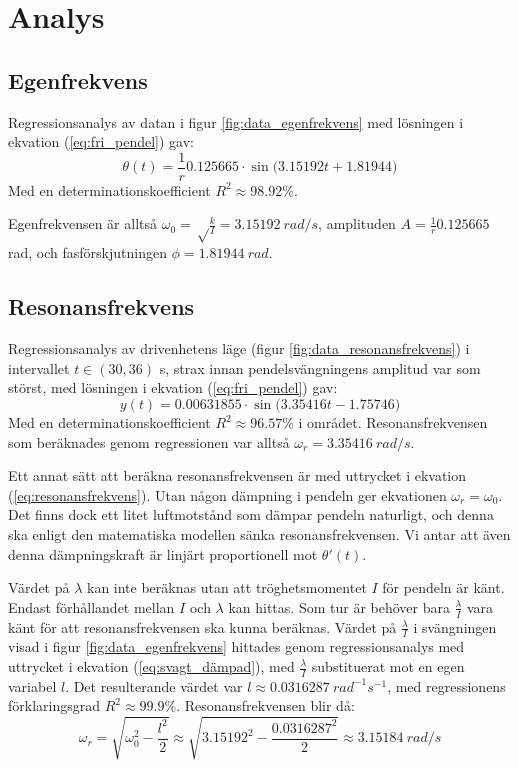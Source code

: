 \documentclass[12pt, a4paper]{article}
\begin{document}
\clearpage
\section{Analys}
\subsection{Egenfrekvens}
Regressionsanalys av datan i figur \ref{fig:data_egenfrekvens} med lösningen i ekvation (\ref{eq:fri_pendel}) gav:
\begin{equation*}
	\theta(t)=\frac{1}{r}0.125665\cdot\sin\bigl(3.15192t+1.81944\bigr)
\end{equation*}
Med en determinationskoefficient $R^2\approx 98.92\%$.

Egenfrekvensen är alltså $\omega_0=\sqrt\frac{k}{I}=\SI{3.15192}{rad/s}$, amplituden $A=\frac{1}{r}0.125665$ \si{rad}, och fas\-förskjutningen $\phi=\SI{1.81944}{rad}$.

\subsection{Resonansfrekvens}
Regressionsanalys av drivenhetens läge (figur \ref{fig:data_resonansfrekvens}) i intervallet $t\in(30,36)$ \si{s}, strax innan pendelsvängningens amplitud var som störst, med lösningen i ekvation (\ref{eq:fri_pendel}) gav:
\begin{equation*}
	y(t)=0.00631855\cdot\sin\bigl(3.35416t-1.75746\bigr)
\end{equation*}
Med en determinationskoefficient $R^2\approx 96.57\%$ i området. Resonansfrekvensen som beräknades genom regressionen var alltså $\omega_r=\SI{3.35416}{rad/s}$. 

Ett annat sätt att beräkna resonansfrekvensen är med uttrycket i ekvation (\ref{eq:resonansfrekvens}). Utan någon dämpning i pendeln ger ekvationen $\omega_r=\omega_0$. Det finns dock ett litet luftmotstånd som dämpar pendeln naturligt, och denna ska enligt den matematiska modellen sänka resonansfrekvensen. Vi antar att även denna dämpningskraft är linjärt proportionell mot $\theta'(t)$.

Värdet på $\lambda$ kan inte beräknas utan att tröghetsmomentet $I$ för pendeln är känt. Endast förhållandet mellan $I$ och $\lambda$ kan hittas. Som tur är behöver bara $\frac{\lambda}{I}$ vara känt för att resonansfrekvensen ska kunna beräknas. Värdet på $\frac{\lambda}{I}$ i svängningen visad i figur \ref{fig:data_egenfrekvens} hittades genom regressionsanalys med uttrycket i ekvation (\ref{eq:svagt_dämpad}), med $\frac{\lambda}{I}$ substituerat mot en egen variabel $l$. Det resulterande värdet var $l\approx\SI{0.0316287}{rad^{-1}s^{-1}}$, med regressionens förklaringsgrad $R^2\approx 99.9\%$. Resonansfrekvensen blir då:
\begin{equation*}
	\omega_r=\sqrt{\omega_0^2-\frac{l^2}{2}}\approx\sqrt{3.15192^2-\frac{0.0316287^2}{2}}\approx\SI{3.15184}{rad/s}
\end{equation*}
\end{document}
